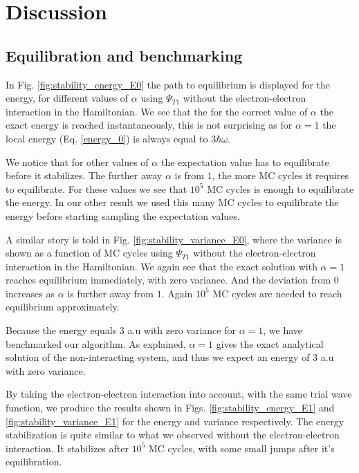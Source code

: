 \documentclass[%
 reprint,
nofootinbib,
aps,
]{revtex4-1}
\begin{document}
\section{Discussion}

\subsection{Equilibration and benchmarking}
In Fig. \vref{fig:stability_energy_E0} the path to equilibrium is displayed for the energy, for different values of $\alpha$ using $\Psi_{T1}$ without the electron-electron interaction in the Hamiltonian. We see that the for the correct value of $ \alpha$ the exact energy is reached instantaneously, this is not surprising as for $\alpha=1$ the local energy (Eq. \eqref{energy_0}) is always equal to $3\hbar\omega$.\par
We notice that for other values of $\alpha$ the expectation value has to equilibrate before it stabilizes. The further away $\alpha$ is from $1$, the more MC cycles it requires to equilibrate. For these values we see that $10^5$ MC cycles is enough to equilibrate the energy. In our other result we used this many MC cycles to equilibrate the energy before starting sampling the expectation values.

A similar story is told in Fig. \vref{fig:stability_variance_E0}, where the variance is shown as a function of MC cycles using $\Psi_{T1}$ without the electron-electron interaction in the Hamiltonian. We again see that the exact solution with $\alpha=1$ reaches equilibrium immediately, with zero variance. And the deviation from $0$ increases as $\alpha$ is further away from $1$. Again $10^5$ MC cycles are needed to reach equilibrium approximately.

Because the energy equals $3$ a.u with zero variance for $\alpha = 1$, we have benchmarked our algorithm. As explained, $\alpha = 1$ gives the exact analytical solution of the non-interacting system, and thus we expect an energy of $3$ a.u with zero variance.

By taking the electron-electron interaction into account, with the same trial wave function, we produce the results shown in Figs. \ref{fig:stability_energy_E1} and \vref{fig:stability_variance_E1} for the energy and variance respectively. The energy stabilization is quite similar to what we observed without the electron-electron interaction. It stabilizes after $10^5$ MC cycles, with some small jumps after it's equilibration.
\end{document}
